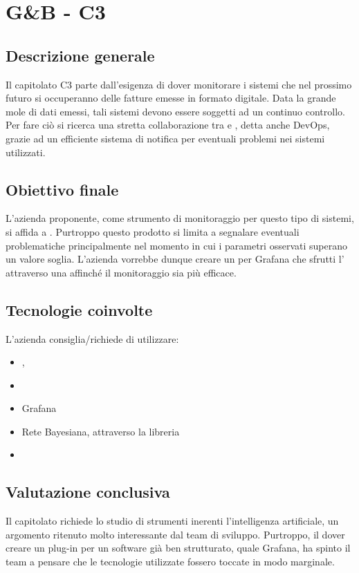 \section{G\&B - C3} \label{c3}
    \subsection{Descrizione generale}
    Il capitolato C3 parte dall'esigenza di dover monitorare i sistemi che nel prossimo futuro si occuperanno delle fatture emesse in formato digitale.
    Data la grande mole di dati emessi, tali sistemi devono essere soggetti ad un continuo controllo. Per fare ciò si ricerca una stretta collaborazione
    tra  e , detta anche DevOps, grazie ad un efficiente sistema di notifica per eventuali problemi nei sistemi utilizzati.

    \subsection{Obiettivo finale}
    L'azienda proponente, come strumento di monitoraggio per questo tipo di sistemi, si affida a . Purtroppo questo prodotto si limita a
    segnalare eventuali problematiche principalmente nel momento in cui i parametri osservati superano un valore soglia. L'azienda vorrebbe dunque creare un 
    per Grafana che sfrutti l' attraverso una  affinché il monitoraggio sia più efficace.

    \subsection{Tecnologie coinvolte}
    L'azienda consiglia/richiede di utilizzare:
    \begin{itemize}
    	\item {}, 
    	\item {}
    	\item Grafana
    	\item Rete Bayesiana, attraverso la libreria 
    	\item {}
    \end{itemize}

    \subsection{Valutazione conclusiva}
    Il capitolato richiede lo studio di strumenti inerenti l'intelligenza artificiale, un argomento ritenuto molto interessante dal team di sviluppo.
    Purtroppo, il dover creare un plug-in per un software già ben strutturato, quale Grafana, ha spinto il team a pensare che le tecnologie utilizzate fossero
    toccate in modo marginale.

